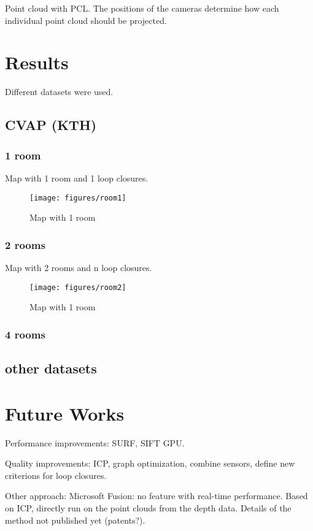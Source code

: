 \documentclass[a4paper,11pt]{kth-mag}
\begin{document}
Point cloud with PCL. The positions of the cameras determine how each individual point cloud should be projected.

\chapter{Results}

Different datasets were used.

\section{CVAP (KTH)}

\subsection{1 room}
Map with 1 room and 1 loop closures.
\begin{figure}[h]
\centering
\texttt{[image: figures/room1]}
\caption{Map with 1 room}
\end{figure}


\subsection{2 rooms}
Map with 2 rooms and n loop closures.
\begin{figure}[h]
\centering
\texttt{[image: figures/room2]}
\caption{Map with 1 room}
\end{figure}

\subsection{4 rooms}

\section{other datasets}

\chapter{Future Works}

Performance improvements: SURF, SIFT GPU.

Quality improvements: ICP, graph optimization, combine sensors, define new criterions for loop closures.

Other approach:
Microsoft Fusion: no feature with real-time performance. Based on ICP, directly run on the point clouds from the depth data. Details of the method not published yet (patents?).
\end{document}
